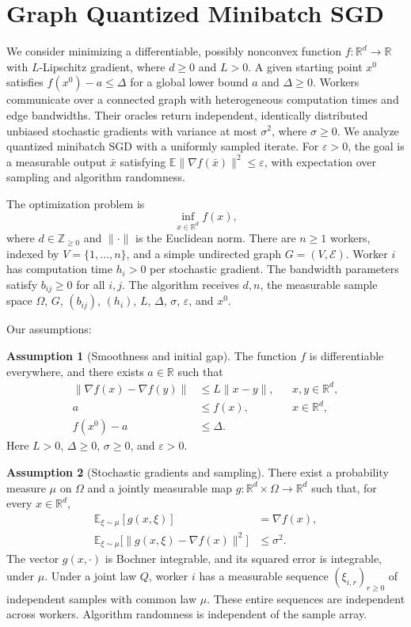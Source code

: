 \documentclass[10pt]{article}
\theoremstyle{definition}
\newtheorem{assumption}{Assumption}
\begin{document}
\section*{Graph Quantized Minibatch SGD}
We consider minimizing a differentiable, possibly nonconvex function $f:\mathbb{R}^d\to\mathbb{R}$ with $L$-Lipschitz gradient, where $d\geq0$ and $L>0$. A given starting point $x^0$ satisfies $f(x^0)-a\leq\Delta$ for a global lower bound $a$ and $\Delta\geq0$. Workers communicate over a connected graph with heterogeneous computation times and edge bandwidths. Their oracles return independent, identically distributed unbiased stochastic gradients with variance at most $\sigma^2$, where $\sigma\geq0$. We analyze quantized minibatch SGD with a uniformly sampled iterate. For $\varepsilon>0$, the goal is a measurable output $\bar{x}$ satisfying $\mathbb{E}\|\nabla f(\bar{x})\|^2\leq\varepsilon$, with expectation over sampling and algorithm randomness.

The optimization problem is
\[
\inf_{x\in\mathbb{R}^d} f(x),
\]
where $d\in\mathbb{Z}_{\geq0}$ and $\|\cdot\|$ is the Euclidean norm. There are $n\geq1$ workers, indexed by $V=\{1,\ldots,n\}$, and a simple undirected graph $G=(V,\mathcal{E})$. Worker $i$ has computation time $h_i>0$ per stochastic gradient. The bandwidth parameters satisfy $b_{ij}\geq0$ for all $i,j$. The algorithm receives $d,n$, the measurable sample space $\Omega$, $G$, $(b_{ij})$, $(h_i)$, $L$, $\Delta$, $\sigma$, $\varepsilon$, and $x^0$.

Our assumptions:
\begin{assumption}[Smoothness and initial gap]
The function $f$ is differentiable everywhere, and there exists $a\in\mathbb{R}$ such that
\[
\begin{aligned}
\|\nabla f(x)-\nabla f(y)\|&\leq L\|x-y\|,
&&x,y\in\mathbb{R}^d,\\
a&\leq f(x),
&&x\in\mathbb{R}^d,\\
f(x^0)-a&\leq\Delta.
\end{aligned}
\]
Here $L>0$, $\Delta\geq0$, $\sigma\geq0$, and $\varepsilon>0$.
\end{assumption}

\begin{assumption}[Stochastic gradients and sampling]
There exist a probability measure $\mu$ on $\Omega$ and a jointly measurable map $g:\mathbb{R}^d\times\Omega\to\mathbb{R}^d$ such that, for every $x\in\mathbb{R}^d$,
\[
\begin{aligned}
\mathbb{E}_{\xi\sim\mu}[g(x,\xi)]&=\nabla f(x),\\
\mathbb{E}_{\xi\sim\mu}
 \bigl[\|g(x,\xi)-\nabla f(x)\|^2\bigr]&\leq\sigma^2.
\end{aligned}
\]
The vector $g(x,\cdot)$ is Bochner integrable, and its squared error is integrable, under $\mu$. Under a joint law $Q$, worker $i$ has a measurable sequence $(\xi_{i,r})_{r\geq0}$ of independent samples with common law $\mu$. These entire sequences are independent across workers. Algorithm randomness is independent of the sample array.
\end{assumption}
\end{document}
